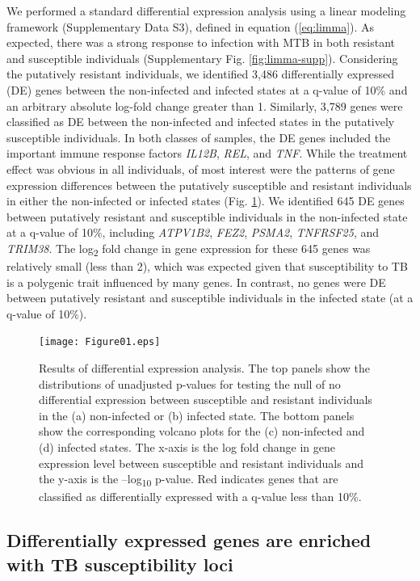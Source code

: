 \documentclass[fleqn,10pt]{wlscirep}
\begin{document}
We performed a standard differential expression analysis using a
linear modeling framework (Supplementary Data S3), defined in equation
(\ref{eq:limma}). As expected, there was a strong response to
infection with MTB in both resistant and susceptible individuals
(Supplementary Fig. \ref{fig:limma-supp}). Considering the putatively
resistant individuals, we identified 3,486 differentially expressed
(DE) genes between the non-infected and infected states at a q-value
of 10\% and an arbitrary absolute log-fold change greater than 1.
Similarly, 3,789 genes were classified as DE between the non-infected
and infected states in the putatively susceptible individuals. In both
classes of samples, the DE genes included the important immune
response factors \emph{IL12B}, \emph{REL}, and \emph{TNF}. While the
treatment effect was obvious in all individuals, of most interest were
the patterns of gene expression differences between the putatively
susceptible and resistant individuals in either the non-infected or
infected states (Fig. \ref{fig:limma}). We identified 645 DE genes
between putatively resistant and susceptible individuals in the
non-infected state at a q-value of 10\%, including \emph{ATPV1B2},
\emph{FEZ2}, \emph{PSMA2}, \emph{TNFRSF25}, and \emph{TRIM38}. The
log\textsubscript{2} fold change in gene expression for these 645
genes was relatively small (less than 2), which was expected given
that susceptibility to TB is a polygenic trait influenced by many
genes. In contrast, no genes were DE between putatively resistant and
susceptible individuals in the infected state (at a q-value of 10\%).

\begin{figure}[p]
\centering
\texttt{[image: Figure01.eps]}
\caption{
Results of differential expression analysis. The top panels show the
distributions of unadjusted p-values for testing the null of no
differential expression between susceptible and resistant individuals
in the (a) non-infected or (b) infected state. The bottom panels show
the corresponding volcano plots for the (c) non-infected and (d)
infected states. The x-axis is the log fold change in gene expression
level between susceptible and resistant individuals and the y-axis is
the –log\textsubscript{10} p-value. Red indicates genes that are
classified as differentially expressed with a q-value less than 10\%.
}
\label{fig:limma}
\end{figure}
\subsection*{Differentially expressed genes are enriched with TB susceptibility loci}
\end{document}
